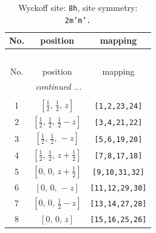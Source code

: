 \documentclass[fleqn,8pt]{jsarticle}
\begin{document}
\begin{longtable}{ccc}
\caption{Wyckoff site: {\tt 8h}, site symmetry: {\tt 2m'm'.}}
 \\
 \hline \hline
No. & position & mapping \\ \hline \endfirsthead

\multicolumn{2}{l}{\tablename\ \thetable{}} \\
 \hline \hline
No. & position & mapping \\ \hline \endhead

 \hline \hline
\multicolumn{2}{r}{\footnotesize\it continued ...} \\ \endfoot

 \hline \hline
\multicolumn{2}{r}{} \\ \endlastfoot

1 & $\left[ \frac{1}{2},\, \frac{1}{2},\, z \right]$ & {\tt [1,2,23,24]} \\ \hline
2 & $\left[ \frac{1}{2},\, \frac{1}{2},\, \frac{1}{2} - z \right]$ & {\tt [3,4,21,22]} \\ \hline
3 & $\left[ \frac{1}{2},\, \frac{1}{2},\, - z \right]$ & {\tt [5,6,19,20]} \\ \hline
4 & $\left[ \frac{1}{2},\, \frac{1}{2},\, z + \frac{1}{2} \right]$ & {\tt [7,8,17,18]} \\ \hline
5 & $\left[ 0,\, 0,\, z + \frac{1}{2} \right]$ & {\tt [9,10,31,32]} \\ \hline
6 & $\left[ 0,\, 0,\, - z \right]$ & {\tt [11,12,29,30]} \\ \hline
7 & $\left[ 0,\, 0,\, \frac{1}{2} - z \right]$ & {\tt [13,14,27,28]} \\ \hline
8 & $\left[ 0,\, 0,\, z \right]$ & {\tt [15,16,25,26]} \\
\end{longtable}
\renewcommand{\arraystretch}{1.2}
\end{document}
